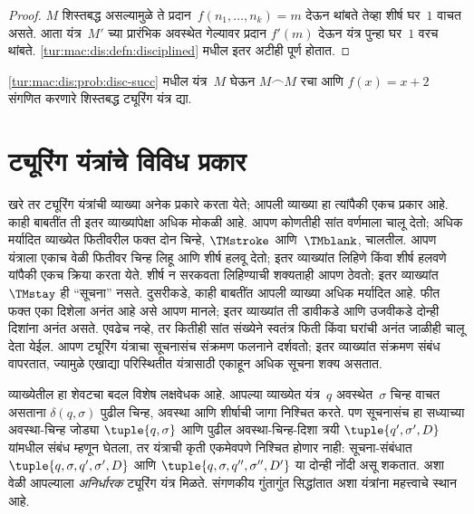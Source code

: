 \begin{proof}
    $M$ शिस्तबद्ध असल्यामुळे ते
    प्रदान~$f(n_1,\dots,n_k) = m$ देऊन थांबते तेव्हा शीर्ष
    घर~$1$ वाचत असते. आता यंत्र~$M'$ च्या प्रारंभिक अवस्थेत
    गेल्यावर प्रदान $f'(m)$ देऊन यंत्र पुन्हा घर~$1$ वरच थांबते.
    \ref{tur:mac:dis:defn:disciplined} मधील इतर अटीही पूर्ण होतात.
\end{proof}

\begin{prob}
    \ref{tur:mac:dis:prob:disc-succ} मधील यंत्र~$M$ घेऊन
    $M \frown M$ रचा आणि $f(x) = x+2$ संगणित करणारे
    शिस्तबद्ध ट्यूरिंग यंत्र द्या.
\end{prob}










\section{ट्यूरिंग यंत्रांचे विविध प्रकार}\label{tur:mac:var:sec}

खरे तर ट्यूरिंग यंत्रांची व्याख्या अनेक प्रकारे करता येते;
आपली व्याख्या हा त्यांपैकी एकच प्रकार आहे. काही बाबतींत ती
इतर व्याख्यांपेक्षा अधिक मोकळी आहे. आपण कोणतीही सांत वर्णमाला
चालू देतो; अधिक मर्यादित व्याख्येत फितीवरील फक्त दोन चिन्हे,
$\TMstroke$ आणि~$\TMblank$, चालतील. आपण यंत्राला एकाच वेळी
फितीवर चिन्ह लिहू आणि शीर्ष हलवू देतो; इतर व्याख्यांत लिहिणे
किंवा शीर्ष हलवणे यांपैकी एकच क्रिया करता येते. शीर्ष न सरकवता
लिहिण्याची शक्यताही आपण ठेवतो; इतर व्याख्यांत $\TMstay$
ही ``सूचना'' नसते. दुसरीकडे, काही बाबतींत आपली व्याख्या अधिक
मर्यादित आहे. फीत फक्त एका दिशेला अनंत आहे असे आपण मानले;
इतर व्याख्यांत ती डावीकडे आणि उजवीकडे दोन्ही दिशांना अनंत
असते. एवढेच नव्हे, तर कितीही सांत संख्येने स्वतंत्र फिती किंवा घरांची
अनंत जाळीही चालू देता येईल. आपण ट्यूरिंग यंत्राचा सूचनासंच
संक्रमण फलनाने दर्शवतो; इतर व्याख्यांत संक्रमण संबंध वापरतात,
ज्यामुळे एखाद्या परिस्थितीत यंत्रासाठी एकाहून अधिक सूचना
शक्य असतात.

व्याख्येतील हा शेवटचा बदल विशेष लक्षवेधक आहे. आपल्या व्याख्येत
यंत्र~$q$ अवस्थेत~$\sigma$ चिन्ह वाचत असताना
$\delta(q, \sigma)$ पुढील चिन्ह, अवस्था आणि शीर्षाची जागा
निश्चित करते. पण सूचनासंच हा सध्याच्या अवस्था-चिन्ह जोड्या
$\tuple{q,
  \sigma}$ आणि पुढील अवस्था-चिन्ह-दिशा त्रयी $\tuple{q', \sigma',
  D}$ यांमधील संबंध म्हणून घेतला, तर यंत्राची कृती एकमेवपणे
निश्चित होणार नाही: सूचना-संबंधात $\tuple{q,
  \sigma, q', \sigma', D}$ आणि $\tuple{q, \sigma, q'', \sigma'', D'}$
या दोन्ही नोंदी असू शकतात. अशा वेळी आपल्याला
\emph{अनिर्धारक} ट्यूरिंग यंत्र मिळते. संगणकीय गुंतागुंत
सिद्धांतात अशा यंत्रांना महत्त्वाचे स्थान आहे.

